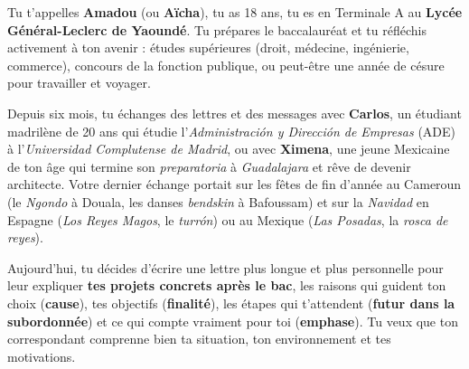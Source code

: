\documentclass[11pt]{article}
\newcounter{popsec}
\newcounter{popsub}
\newcommand{\courssub}[1]{%
  \stepcounter{popsub}%
  \par\vspace{9pt}\noindent{\popxbold\fontsize{11.5}{13}\selectfont\color{popink}{\color{poporange}\thepopsec.\thepopsub}\hspace{6pt}#1}\par\nopagebreak\vspace{4pt}
}
\begin{document}
\courssub{Situation}
\begin{textebox}
Tu t'appelles \textbf{Amadou} (ou \textbf{Aïcha}), tu as 18 ans, tu es en Terminale A au \textbf{Lycée Général-Leclerc de Yaoundé}. Tu prépares le baccalauréat et tu réfléchis activement à ton avenir : études supérieures (droit, médecine, ingénierie, commerce), concours de la fonction publique, ou peut-être une année de césure pour travailler et voyager.

Depuis six mois, tu échanges des lettres et des messages avec \textbf{Carlos}, un étudiant madrilène de 20 ans qui étudie l'\emph{Administración y Dirección de Empresas} (ADE) à l'\emph{Universidad Complutense de Madrid}, ou avec \textbf{Ximena}, une jeune Mexicaine de ton âge qui termine son \emph{preparatoria} à \emph{Guadalajara} et rêve de devenir architecte. Votre dernier échange portait sur les fêtes de fin d'année au Cameroun (le \emph{Ngondo} à Douala, les danses \emph{bendskin} à Bafoussam) et sur la \emph{Navidad} en Espagne (\emph{Los Reyes Magos}, le \emph{turrón}) ou au Mexique (\emph{Las Posadas}, la \emph{rosca de reyes}).

Aujourd'hui, tu décides d'écrire une lettre plus longue et plus personnelle pour leur expliquer \textbf{tes projets concrets après le bac}, les raisons qui guident ton choix (\textbf{cause}), tes objectifs (\textbf{finalité}), les étapes qui t'attendent (\textbf{futur dans la subordonnée}) et ce qui compte vraiment pour toi (\textbf{emphase}). Tu veux que ton correspondant comprenne bien ta situation, ton environnement et tes motivations.
\end{textebox}
\end{document}
